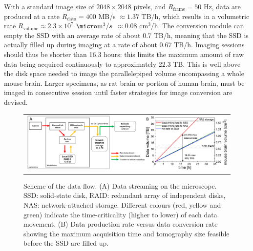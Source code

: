 \documentclass[12pt]{spieman}  %
\begin{document}
With a standard image size of $2048 \times 2048$ pixels, and $R_{\text{frame}}=50$ Hz, data are produced at a rate $R_{\text{data}}=400$ MB/s $\approx 1.37$ TB/h, which results in a volumetric rate $R_{\text{volume}} \approx 2.3 \times 10^7$ $\micro\text{m}^3/s$ $\approx 0.08$ $\text{cm}^3$/h. The conversion module can empty the SSD with an average rate of about 0.7 TB/h, meaning that the SSD is actually filled up during imaging at a rate of about 0.67 TB/h. Imaging sessions should thus be shorter than 16.3 hours: this limits the maximum amount of raw data being acquired continuously to approximately 22.3 TB. This is well above the disk space needed to image the parallelepiped volume encompassing a whole mouse brain. Larger specimens, as rat brain or portion of human brain, must be imaged in consecutive session until faster strategies for image conversion are devised.


	\begin{figure}
   \begin{center}
   \begin{tabular}{c}
   \includegraphics[width=\textwidth]{DataFlow.eps}
   \end{tabular}
   \end{center}
   \caption{\label{fig:DataFlow} Scheme of the data flow. (A) Data streaming on the microscope. SSD: solid-state disk, RAID: redundant array of independent disks, NAS: network-attached storage. Different colours (red, yellow and green) indicate the time-criticality (higher to lower) of each data movement. (B) Data production rate versus data conversion rate showing the maximum acquisition time and tomography size feasible before the SSD are filled up.} 
   \end{figure}
\end{document}
